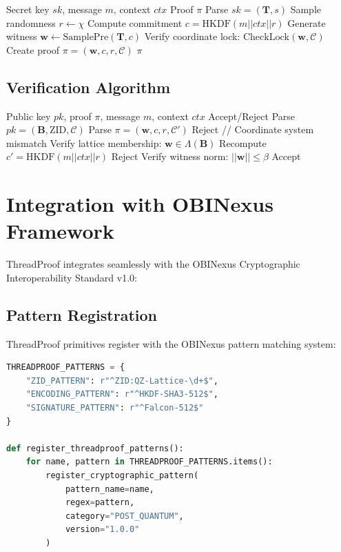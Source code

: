 \documentclass[11pt]{article}
\theoremstyle{definition}
\begin{document}
\begin{algorithm}
\caption{ThreadProof Generation}
\begin{algorithmic}[1]
\REQUIRE Secret key $sk$, message $m$, context $ctx$
\ENSURE Proof $\pi$
\STATE Parse $sk = (\mathbf{T}, s)$
\STATE Sample randomness $r \leftarrow \chi$
\STATE Compute commitment $c = \text{HKDF}(m || ctx || r)$
\STATE Generate witness $\mathbf{w} \leftarrow \text{SamplePre}(\mathbf{T}, c)$
\STATE Verify coordinate lock: $\text{CheckLock}(\mathbf{w}, \mathcal{C})$
\STATE Create proof $\pi = (\mathbf{w}, c, r, \mathcal{C})$
\RETURN $\pi$
\end{algorithmic}
\end{algorithm}

\subsection{Verification Algorithm}

\begin{algorithm}
\caption{ThreadProof Verification}
\begin{algorithmic}[1]
\REQUIRE Public key $pk$, proof $\pi$, message $m$, context $ctx$
\ENSURE Accept/Reject
\STATE Parse $pk = (\mathbf{B}, \text{ZID}, \mathcal{C})$
\STATE Parse $\pi = (\mathbf{w}, c, r, \mathcal{C}')$
    \RETURN Reject  // Coordinate system mismatch
\ENDIF
\STATE Verify lattice membership: $\mathbf{w} \in \Lambda(\mathbf{B})$
\STATE Recompute $c' = \text{HKDF}(m || ctx || r)$
    \RETURN Reject
\ENDIF
\STATE Verify witness norm: $||\mathbf{w}|| \leq \beta$
\RETURN Accept
\end{algorithmic}
\end{algorithm}

\section{Integration with OBINexus Framework}

ThreadProof integrates seamlessly with the OBINexus Cryptographic Interoperability Standard v1.0:

\subsection{Pattern Registration}

ThreadProof primitives register with the OBINexus pattern matching system:

\begin{lstlisting}[language=Python, caption=ThreadProof Pattern Registration]
THREADPROOF_PATTERNS = {
    "ZID_PATTERN": r"^ZID:QZ-Lattice-\d+$",
    "ENCODING_PATTERN": r"^HKDF-SHA3-512$",
    "SIGNATURE_PATTERN": r"^Falcon-512$"
}

def register_threadproof_patterns():
    for name, pattern in THREADPROOF_PATTERNS.items():
        register_cryptographic_pattern(
            pattern_name=name,
            regex=pattern,
            category="POST_QUANTUM",
            version="1.0.0"
        )
\end{lstlisting}
\end{document}

